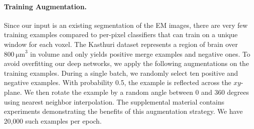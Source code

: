 \paragraph{Training Augmentation.}

Since our input is an existing segmentation of the EM images, there are very few training examples compared to per-pixel classifiers that can train on a unique window for each voxel. 
The Kasthuri dataset represents a region of brain over $\SI[product-units=single]{800}{\micro\meter}^3$ in volume and only yields  positive merge examples and  negative ones.
To avoid overfitting our deep networks, we apply the following augmentations on the training examples.
During a single batch, we randomly select ten positive and negative examples. 
With probability 0.5, the example is reflected across the $xy$-plane. 
We then rotate the example by a random angle between $0$ and $360$ degrees using nearest neighbor interpolation. 
The supplemental material contains experiments demonstrating the benefits of this augmentation strategy.
We have 20,000 such examples per epoch.